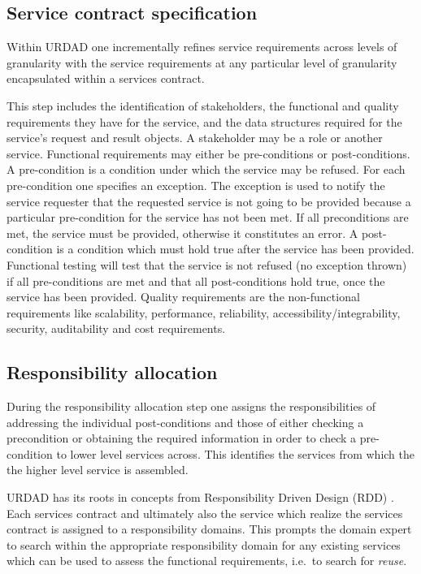 \subsection{Service contract specification}

Within URDAD one incrementally refines service requirements across levels of granularity with the service requirements at any particular level of granularity encapsulated within a services contract.

This step includes the identification of stakeholders, the functional and quality requirements they have for the service, and the data structures required for the service's request and result objects. A stakeholder may be a role or another service. Functional requirements may either be pre-conditions or  post-conditions. A pre-condition is a condition under which the service may be refused. For each pre-condition one specifies an exception. The exception is used to notify the service requester that the requested service is not going to be provided because a particular pre-condition for the service has not been met. If all preconditions are met, the service must be provided, otherwise it constitutes an error. A post-condition is a condition which must hold true after the service has been provided. Functional testing will test that the service is not refused (no exception thrown) if all pre-conditions are met and that all post-conditions hold true, once the service has been provided. Quality requirements are the non-functional requirements like scalability, performance, reliability, accessibility/integrability, security, auditability and cost requirements. 

\subsection{Responsibility allocation}

During the responsibility allocation step one assigns the responsibilities of addressing the individual post-conditions and those of either checking a precondition or obtaining the required information in order to check a pre-condition to lower level services across. This identifies the services from which the the higher level service is assembled.

URDAD has its roots in concepts from Responsibility Driven Design (RDD) \cite{wirfs-brock_object-oriented_1989,wirfs-brock_object_2002}. Each services contract and ultimately also the service which realize the services contract is assigned to a responsibility domains. This prompts the domain expert to search within the appropriate responsibility domain for any existing services which can be used to assess the functional requirements, i.e.\ to search for \emph{reuse}.

